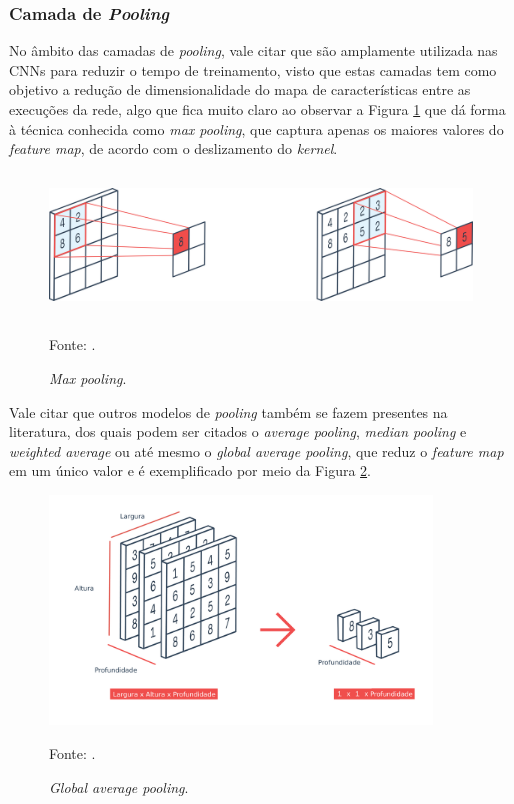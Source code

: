 \subsubsection{Camada de \textit{Pooling}}
\label{deep:pooling}

No âmbito das camadas de \textit{pooling}, vale citar que são amplamente utilizada nas CNNs para reduzir o tempo de treinamento, visto que estas camadas tem como objetivo a redução de dimensionalidade do mapa de características entre as execuções da rede, algo que fica muito claro ao observar a Figura \ref{deep:fig:7} que dá forma à técnica conhecida como \textit{max pooling}, que captura apenas os maiores valores do \textit{feature map}, de acordo com o deslizamento do \textit{kernel}.

\begin{figure}[H]
    \centering
    \caption{\textit{Max pooling}.}
    \includegraphics[height=1.5in]{recursos/imagens/deep/max_pooling.png}
    \label{deep:fig:7}
    
    \vspace*{1 cm}
    Fonte: \cite{PeltarionAI}.
\end{figure}

Vale citar que outros modelos de \textit{pooling} também se fazem presentes na literatura, dos quais podem ser citados o \textit{average pooling}, \textit{median pooling} e \textit{weighted average}\cite{Goodfellow2016} ou até mesmo o \textit{global average pooling}, que reduz o \textit{feature map} em um único valor e é exemplificado por meio da Figura \ref{deep:fig:8}.

\begin{figure}[H]
    \centering
    \caption{\textit{Global average pooling}.}
    \includegraphics[height=2.4in]{recursos/imagens/deep/global_average_pooling.png}
    \label{deep:fig:8}
    
    \vspace*{1 cm}
    Fonte: \cite{PeltarionAI}.
\end{figure}

